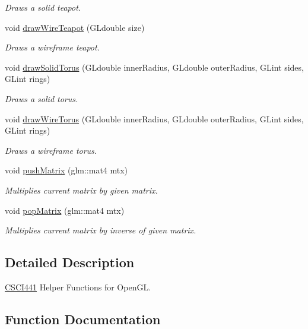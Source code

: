 \begin{DoxyCompactItemize}
\begin{DoxyCompactList}\small\item\em Draws a solid teapot. \end{DoxyCompactList}\item 
void \hyperlink{namespace_c_s_c_i441_a01d46d279b92690808b4bc5b8cbf9035}{draw\+Wire\+Teapot} (G\+Ldouble size)
\begin{DoxyCompactList}\small\item\em Draws a wireframe teapot. \end{DoxyCompactList}\item 
void \hyperlink{namespace_c_s_c_i441_ad17893017873d6e4777e299f25341657}{draw\+Solid\+Torus} (G\+Ldouble inner\+Radius, G\+Ldouble outer\+Radius, G\+Lint sides, G\+Lint rings)
\begin{DoxyCompactList}\small\item\em Draws a solid torus. \end{DoxyCompactList}\item 
void \hyperlink{namespace_c_s_c_i441_a8b40c06c875203f1e3d5f6bd0331a0b7}{draw\+Wire\+Torus} (G\+Ldouble inner\+Radius, G\+Ldouble outer\+Radius, G\+Lint sides, G\+Lint rings)
\begin{DoxyCompactList}\small\item\em Draws a wireframe torus. \end{DoxyCompactList}\item 
void \hyperlink{namespace_c_s_c_i441_aa818e8189c42c50e88d6d0512274bcfb}{push\+Matrix} (glm\+::mat4 mtx)
\begin{DoxyCompactList}\small\item\em Multiplies current matrix by given matrix. \end{DoxyCompactList}\item 
void \hyperlink{namespace_c_s_c_i441_ae423b2406df96b1cafe485245e4f9203}{pop\+Matrix} (glm\+::mat4 mtx)
\begin{DoxyCompactList}\small\item\em Multiplies current matrix by inverse of given matrix. \end{DoxyCompactList}\end{DoxyCompactItemize}


\subsection{Detailed Description}
\hyperlink{namespace_c_s_c_i441}{C\+S\+C\+I441} Helper Functions for Open\+GL. 

\subsection{Function Documentation}
\mbox{\label{namespace_c_s_c_i441_a484e60eb6fb39efef552b7838ca35164}} 
